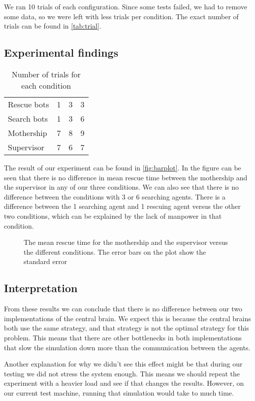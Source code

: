 We ran 10 trials of each configuration. Since some tests failed, we had to
remove some data, so we were left with less trials per condition. The exact
number of trials can be found in \autoref{tab:trial}.

\subsection{Experimental findings}

\begin{table}
    \centering
    \caption{Number of trials for each condition}
    \label{tab:trial}
    \begin{tabular}{l|ccc}
        Rescue bots & 1 & 3 & 3 \\
        Search bots & 1 & 3 & 6 \\ \hline
        Mothership  & 7 & 8 & 9 \\
        Supervisor  & 7 & 6 & 7
    \end{tabular}
\end{table}

The result of our experiment can be found in \autoref{fig:barplot}. In the
figure can be seen that there is no difference in mean rescue time between
the mothership and the supervisor in any of our three conditions. We can
also see that there is no difference between the conditions with 3 or 6
searching agents. There is a difference between the 1 searching agent and 1
rescuing agent versus the other two conditions, which can be explained by
the lack of manpower in that condition. 

\begin{figure}
    \centering
    \resizebox{0.75\textwidth}{!}{
        }
    \caption{The mean rescue time for the mothership and the supervisor
        versus the different conditions. The error bars on the plot show
        the standard error}
    \label{fig:barplot}
\end{figure}

\subsection{Interpretation}
From these results we can conclude that there is no difference between our
two implementations of the central brain. We expect this is because the
central brains both use the same strategy, and that strategy is not the
optimal strategy for this problem. This means that there are other
bottlenecks in both implementations that slow the simulation down more
than the communication between the agents. 

Another explanation for why we didn't see this effect might be that during our
testing we did not stress the system enough. This means we should repeat
the experiment with a heavier load and see if that changes the results.
However, on our current test machine, running that simulation would take to
much time. 
